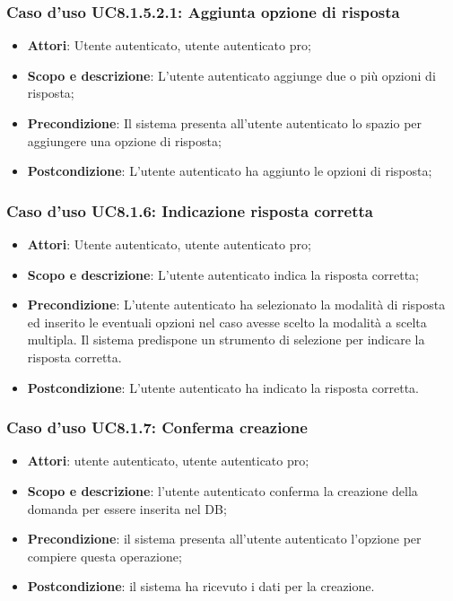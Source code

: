 	\subsubsection{Caso d'uso UC8.1.5.2.1: Aggiunta opzione di risposta}
		\begin{itemize}
		\item
			\textbf{Attori}: Utente autenticato, utente autenticato pro;
		\item
			\textbf{Scopo e descrizione}: L'utente autenticato aggiunge due o più opzioni di risposta;
		\item		
			\textbf{Precondizione}: Il sistema presenta all'utente autenticato lo spazio per aggiungere una opzione di risposta;
		\item		
			\textbf{Postcondizione}: L'utente autenticato ha aggiunto le opzioni di  risposta;
		\end{itemize}
	\subsubsection{Caso d'uso UC8.1.6: Indicazione risposta corretta}
		\begin{itemize}
		\item
			\textbf{Attori}: Utente autenticato, utente autenticato pro;
		\item
			\textbf{Scopo e descrizione}: L'utente autenticato indica la risposta corretta;
		\item		
			\textbf{Precondizione}: L'utente autenticato ha selezionato la modalità di risposta ed inserito le eventuali opzioni nel caso avesse scelto la modalità a scelta multipla. Il sistema predispone un strumento di selezione per indicare la risposta corretta.
		\item		
			\textbf{Postcondizione}: L'utente autenticato ha indicato la risposta corretta.
		\end{itemize}
	\subsubsection{Caso d'uso UC8.1.7: Conferma creazione}
	\begin{itemize}
		\item
			\textbf{Attori}: utente autenticato, utente autenticato pro;
		\item
			\textbf{Scopo e descrizione}: l'utente autenticato conferma la creazione della domanda per essere inserita nel DB;
		\item		
			\textbf{Precondizione}: il sistema presenta all'utente autenticato l'opzione per compiere questa operazione;
		\item
			\textbf{Postcondizione}: il sistema ha ricevuto i dati per la creazione.
	\end{itemize}	

